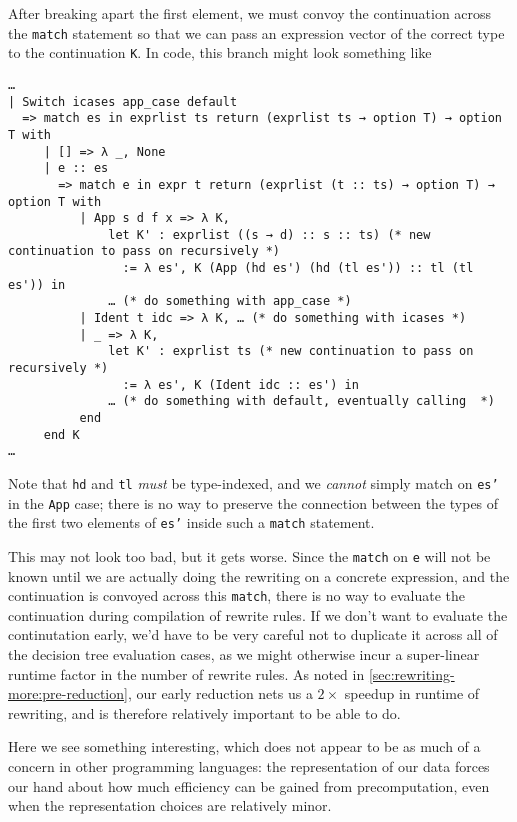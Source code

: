 After breaking apart the first element, we must convoy  the continuation across the \texttt{match} statement so that we can pass an expression vector of the correct type to the continuation \texttt{K}.
In code, this branch might look something like
\begin{verbatim}
…
| Switch icases app_case default
  => match es in exprlist ts return (exprlist ts → option T) → option T with
     | [] => λ _, None
     | e :: es
       => match e in expr t return (exprlist (t :: ts) → option T) → option T with
          | App s d f x => λ K,
              let K' : exprlist ((s → d) :: s :: ts) (* new continuation to pass on recursively *)
                := λ es', K (App (hd es') (hd (tl es')) :: tl (tl es')) in
              … (* do something with app_case *)
          | Ident t idc => λ K, … (* do something with icases *)
          | _ => λ K,
              let K' : exprlist ts (* new continuation to pass on recursively *)
                := λ es', K (Ident idc :: es') in
              … (* do something with default, eventually calling  *)
          end
     end K
…
\end{verbatim}
Note that \texttt{hd} and \texttt{tl} \emph{must} be type-indexed, and we \emph{cannot} simply match on \texttt{es'} in the \texttt{App} case;
there is no way to preserve the connection between the types of the first two elements of \texttt{es'} inside such a \texttt{match} statement.

This may not look too bad, but it gets worse.
Since the \texttt{match} on \texttt{e} will not be known until we are actually doing the rewriting on a concrete expression, and the continuation is convoyed across this \texttt{match}, there is no way to evaluate the continuation during compilation of rewrite rules.
If we don't want to evaluate the continutation early, we'd have to be very careful not to duplicate it across all of the decision tree evaluation cases, as we might otherwise incur a super-linear runtime factor in the number of rewrite rules.
As noted in \autoref{sec:rewriting-more:pre-reduction}, our early reduction nets us a $2\times$ speedup in runtime of rewriting, and is therefore relatively important to be able to do.

Here we see something interesting, which does not appear to be as much of a concern in other programming languages:
the representation of our data forces our hand about how much efficiency can be gained from precomputation, even when the representation choices are relatively minor.

